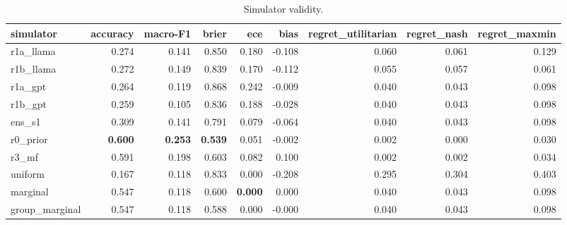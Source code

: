 \begin{table}[t]
\centering
\small
\begin{tabular}{lrrrrrrrr}
\toprule
simulator & accuracy & macro-F1 & brier & ece & bias & regret\_utilitarian & regret\_nash & regret\_maxmin \\
\midrule
r1a\_llama & 0.274 & 0.141 & 0.850 & 0.180 & -0.108 & 0.060 & 0.061 & 0.129 \\
r1b\_llama & 0.272 & 0.149 & 0.839 & 0.170 & -0.112 & 0.055 & 0.057 & 0.061 \\
r1a\_gpt & 0.264 & 0.119 & 0.868 & 0.242 & -0.009 & 0.040 & 0.043 & 0.098 \\
r1b\_gpt & 0.259 & 0.105 & 0.836 & 0.188 & -0.028 & 0.040 & 0.043 & 0.098 \\
ens\_s1 & 0.309 & 0.141 & 0.791 & 0.079 & -0.064 & 0.040 & 0.043 & 0.098 \\
r0\_prior & \textbf{0.600} & \textbf{0.253} & \textbf{0.539} & 0.051 & -0.002 & 0.002 & 0.000 & 0.030 \\
r3\_mf & 0.591 & 0.198 & 0.603 & 0.082 & 0.100 & 0.002 & 0.002 & 0.034 \\
uniform & 0.167 & 0.118 & 0.833 & 0.000 & -0.208 & 0.295 & 0.304 & 0.403 \\
marginal & 0.547 & 0.118 & 0.600 & \textbf{0.000} & 0.000 & 0.040 & 0.043 & 0.098 \\
group\_marginal & 0.547 & 0.118 & 0.588 & 0.000 & -0.000 & 0.040 & 0.043 & 0.098 \\
\bottomrule
\end{tabular}
\caption{Simulator validity.}
\label{tab:simulators}
\end{table}
